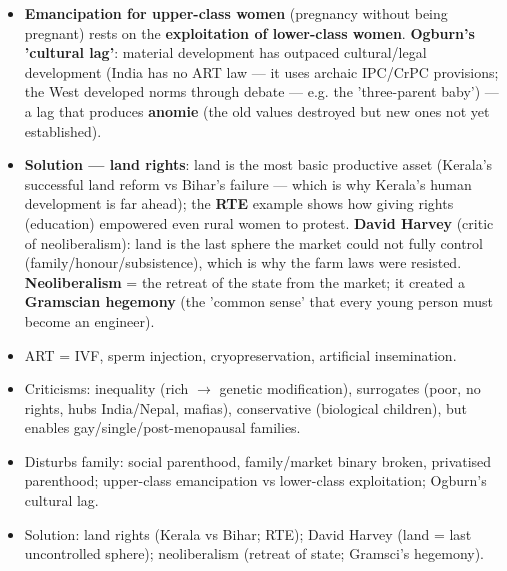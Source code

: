 \begin{KeyConcept}
\begin{itemize}
\item \textbf{Emancipation for upper-class women} (pregnancy without being pregnant) rests on the \textbf{exploitation of lower-class women}. \textbf{Ogburn's 'cultural lag'}: material development has outpaced cultural/legal development (India has no ART law --- it uses archaic IPC/CrPC provisions; the West developed norms through debate --- e.g. the 'three-parent baby') --- a lag that produces \textbf{anomie} (the old values destroyed but new ones not yet established).
\end{itemize}
\end{KeyConcept}

\begin{KeyConcept}
\begin{itemize}
\item \textbf{Solution --- land rights}: land is the most basic productive asset (Kerala's successful land reform vs Bihar's failure --- which is why Kerala's human development is far ahead); the \textbf{RTE} example shows how giving rights (education) empowered even rural women to protest. \textbf{David Harvey} (critic of neoliberalism): land is the last sphere the market could not fully control (family/honour/subsistence), which is why the farm laws were resisted. \textbf{Neoliberalism} = the retreat of the state from the market; it created a \textbf{Gramscian hegemony} (the 'common sense' that every young person must become an engineer).
\end{itemize}
\end{KeyConcept}

\begin{QuickRevision}
\begin{itemize}
\item ART = IVF, sperm injection, cryopreservation, artificial insemination.
\item Criticisms: inequality (rich $\rightarrow$ genetic modification), surrogates (poor, no rights, hubs India/Nepal, mafias), conservative (biological children), but enables gay/single/post-menopausal families.
\item Disturbs family: social parenthood, family/market binary broken, privatised parenthood; upper-class emancipation vs lower-class exploitation; Ogburn's cultural lag.
\item Solution: land rights (Kerala vs Bihar; RTE); David Harvey (land = last uncontrolled sphere); neoliberalism (retreat of state; Gramsci's hegemony).
\end{itemize}
\end{QuickRevision}

